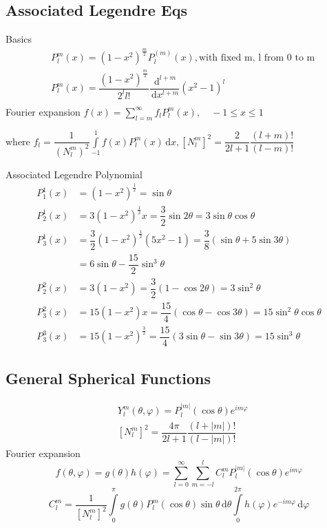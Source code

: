 \documentclass[10pt, a4paper, twocolumn]{article}
\def\d{\,\mathrm{d}}
\def\phi{\varphi}
\begin{document}
\subsection{Associated Legendre Eqs}
	Basics
	\begin{align*}
		&P_l^m(x) = (1-x^2)^{\frac{m}{2}}P^{(m)}_l(x), \text{with fixed m, l from 0 to m}\\
		&P_l^m(x) = \dfrac{(1-x^2)^{\frac{m}{2}}}{2^l l!}\dfrac{\d^{l+m}}{\d x^{l+m}}(x^2-1)^l\\
	\end{align*}
	Fourier expansion $f(x) = \displaystyle\sum^\infty_{l=m}f_lP^m_l(x), \quad -1 \leq x \leq 1$
	
	where $f_l = \dfrac{1}{(N^m_l)^2}\displaystyle\int \limits^1_{-1}f(x)P^m_l(x)\d x, [N^m_l]^2 = \dfrac{2}{2l+1}\dfrac{(l+m)!}{(l-m)!}$
	
	Associated Legendre Polynomial
	\begin{align*}
		P^1_1(x) &= (1-x^2)^{\frac{1}{2}}=\sin\theta\\
		P^1_2(x) &= 3(1-x^2)^{\frac{1}{2}}x = \dfrac{3}{2}\sin2\theta = 3\sin\theta\cos\theta\\
		P^1_3(x) &= \dfrac{3}{2}(1-x^2)^{\frac{1}{2}}(5x^2-1) = \dfrac{3}{8}(\sin\theta+5\sin3\theta)\\
		&= 6\sin\theta - \dfrac{15}{2}\sin^3\theta\\
		P^2_2(x) &= 3(1-x^2) = \dfrac{3}{2}(1-\cos2\theta) = 3\sin^2\theta\\
		P^2_3(x) &= 15(1-x^2)x = \dfrac{15}{4}(\cos\theta-\cos3\theta) = 15\sin^2\theta\cos\theta\\
		P^3_3(x) &= 15(1-x^2)^{\frac{3}{2}}=\dfrac{15}{4}(3\sin\theta-\sin3\theta) = 15\sin^3\theta
	\end{align*}

\subsection{General Spherical Functions}

	\begin{align*}
		&Y^m_l(\theta,\phi) = P^{|m|}_l(\cos\theta)e^{im\phi}\\
		&[N^m_l]^2 = \dfrac{4\pi}{2l+1}\dfrac{(l+|m|)!}{(l-|m|)!}
	\end{align*}
	Fourier expansion
	$$f(\theta, \phi) =g(\theta)h(\phi) = \displaystyle\sum^\infty_{l=0}\sum^l_{m=-l}C^m_lP^{|m|}_l(\cos\theta)e^{im\phi}$$
	$$C^m_l = \dfrac{1}{[N^m_l]^2}\displaystyle\int \limits^\pi_{0}g(\theta)P^m_l(\cos\theta)\sin\theta\d \theta
		\int\limits^{2\pi}_0 h(\phi)e^{-im\phi}\d \phi$$
\end{document}
